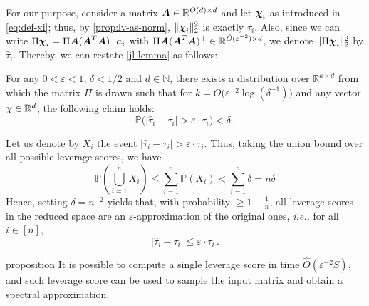 For our purpose, consider a matrix $\boldsymbol A \in \mathbb{R}^{\tilde O(d)\times d}$ and
let $\boldsymbol {\chi}_i$ as introduced in \autoref{eq:def-xi}; thus, by
\autoref{prop:lv-as-norm}, $\|\boldsymbol {\chi}_i\|_2^2 $ is exactly $ \tau_i$. Also, since
we can write $\Pi \boldsymbol {\chi}_i = \Pi \boldsymbol A(\boldsymbol A^T\boldsymbol A)^+a_i$ with $\Pi \boldsymbol A(\boldsymbol A^T\boldsymbol A)^+ \in
\mathbb R^{\tilde O (\varepsilon^{-2})\times d}$, we denote $\| \Pi \boldsymbol {\chi}_i
\|_2^2$ by $\hat \tau_i$. Thereby, we can restate \autoref{jl-lemma} as follows:

\begin{lemma}
    For any $0 < \varepsilon < 1$, $\delta < 1/2$ and $d \in \mathbb N$, there
    exists a distribution over $\displaystyle \mathbb {R} ^{k\times d}$ from
    which the matrix $\Pi$ is drawn such that for $k =
    O\big(\varepsilon^{-2}\log(\delta^{-1})\big)$ and any vector $\chi \in \mathbb
    R^d$, the following claim holds:
    \begin{equation*}
        \mathbb P \Big(\left | \hat \tau_i - \tau_i \right | > \varepsilon
        \cdot \tau_i \Big)<\delta \, .
    \end{equation*}
\end{lemma}

Let us denote by $X_i$ the event \guillemotleft $\left| \hat \tau_i - \tau_i
\right| > \varepsilon \cdot \tau_i$\guillemotright. Thus, taking the union
bound over all possible leverage scores, we have
\begin{equation*}
    \mathbb P (\bigcup_{i=1}^n X_i) \leq \sum_{i=1}^n \mathbb P(X_i) <
    \sum_{i=1}^n \delta = n \delta
\end{equation*}
Hence, setting $\delta = n^{-2}$ yields that, with probability $\geq 1-
\frac{1}{n}$, all leverage scores in the reduced space are an
$\varepsilon$-approximation of the original ones, \textit{i.e.,} for all $i \in [n]$,
\begin{equation}\label{eq:prob}
\left | \hat \tau_i - \tau_i \right | \leq  \varepsilon \cdot \tau_i \, .
\end{equation}


\begin{theoremEnd}{proposition}\label{prop:time-complexity-jl-lv}
    It is possible to compute a single leverage score in time $\hat
    O(\varepsilon^{-2}S)$, and such leverage score can be used to sample the
    input matrix and obtain a spectral approximation.
\end{theoremEnd}

